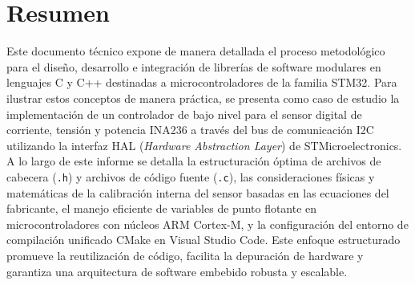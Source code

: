 \documentclass[
10pt, %
a4paper, %
oneside, %
headinclude,footinclude, %
BCOR5mm, %
]{scrartcl}
\begin{document}
\setcounter{tocdepth}{3} %

\section*{Resumen}
Este documento técnico expone de manera detallada el proceso metodológico para el diseño, desarrollo e integración de librerías de software modulares en lenguajes C y C++ destinadas a microcontroladores de la familia STM32. Para ilustrar estos conceptos de manera práctica, se presenta como caso de estudio la implementación de un controlador de bajo nivel para el sensor digital de corriente, tensión y potencia INA236 a través del bus de comunicación I2C utilizando la interfaz HAL (\textit{Hardware Abstraction Layer}) de STMicroelectronics.\\

A lo largo de este informe se detalla la estructuración óptima de archivos de cabecera (\texttt{.h}) y archivos de código fuente (\texttt{.c}), las consideraciones físicas y matemáticas de la calibración interna del sensor basadas en las ecuaciones del fabricante, el manejo eficiente de variables de punto flotante en microcontroladores con núcleos ARM Cortex-M, y la configuración del entorno de compilación unificado CMake en Visual Studio Code. Este enfoque estructurado promueve la reutilización de código, facilita la depuración de hardware y garantiza una arquitectura de software embebido robusta y escalable.
\newpage %

\tableofcontents %




\newpage
\end{document}
